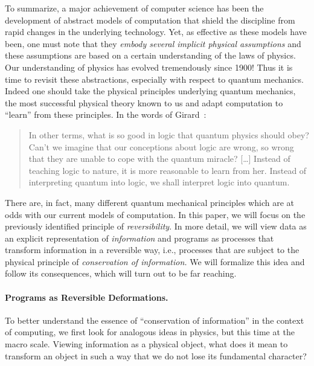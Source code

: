 \documentclass{article}
\begin{document}
To summarize, a major achievement of computer science has been the
development of abstract models of computation that shield the
discipline from rapid changes in the underlying technology. Yet, as
effective as these models have been, one must note that they
\emph{embody several implicit physical assumptions} and these
assumptions are based on a certain understanding of the laws of
physics. Our understanding of physics has evolved tremendously since
1900!  Thus it is time to revisit these abstractions, especially with
respect to quantum mechanics.  Indeed one should take the physical
principles underlying quantum mechanics, the most successful physical
theory known to us and adapt computation to ``learn'' from these
principles.  In the words of Girard~\cite{Girard:2007:TMI:1348911.1348915}:
\begin{quote}
  In other terms, what is so good in logic that quantum physics should
  obey?  Can't we imagine that our conceptions about logic are wrong,
  so wrong that they are unable to cope with the quantum miracle?
  [\ldots] Instead of teaching logic to nature, it is more reasonable
  to learn from her. Instead of interpreting quantum into logic, we
  shall interpret logic into quantum.
\end{quote}

There are, in fact, many different quantum mechanical principles which
are at odds with our current models of computation. In this paper, we
will focus on the previously identified principle of
\emph{reversibility}. In more detail, we will view data as an explicit
representation of \emph{information} and programs as processes that
transform information in a reversible way, i.e., processes that are
subject to the physical principle of \emph{conservation of
  information.} We will formalize this idea and follow its
consequences, which will turn out to be far reaching.

\paragraph*{Programs as Reversible Deformations.}
To better understand the essence of ``conservation of information'' in
the context of computing, we first look for analogous ideas in
physics, but this time at the macro scale. Viewing information as a
physical object, what does it mean to transform an object in such a
way that we do not lose its fundamental character?
\end{document}
